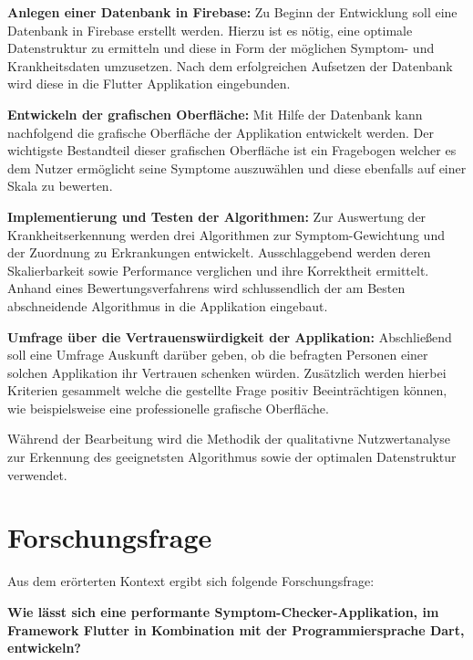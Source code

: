 \begin{description}
	\item \textbf{Anlegen einer Datenbank in Firebase:}
	Zu Beginn der Entwicklung soll eine Datenbank in Firebase erstellt werden. Hierzu ist es nötig, eine optimale Datenstruktur zu ermitteln und diese in Form der möglichen Symptom- und Krankheitsdaten umzusetzen. Nach dem erfolgreichen Aufsetzen der Datenbank wird diese in die Flutter Applikation eingebunden.
	
	\item \textbf{Entwickeln der grafischen Oberfläche:}
	Mit Hilfe der Datenbank kann nachfolgend die grafische Oberfläche der Applikation entwickelt werden. Der wichtigste Bestandteil dieser grafischen Oberfläche ist ein Fragebogen welcher es dem Nutzer ermöglicht seine Symptome auszuwählen und diese ebenfalls auf einer Skala zu bewerten.
	
	\item \textbf{Implementierung und Testen der Algorithmen:}
	 Zur Auswertung der Krankheitserkennung werden drei Algorithmen zur Symptom-Gewichtung und der Zuordnung zu Erkrankungen entwickelt. Ausschlaggebend werden deren Skalierbarkeit sowie Performance verglichen und ihre Korrektheit ermittelt. Anhand eines Bewertungsverfahrens wird schlussendlich der am Besten abschneidende Algorithmus in die Applikation eingebaut.
	 
	 \item \textbf{Umfrage über die Vertrauenswürdigkeit der Applikation:}
	 Abschließend soll eine Umfrage Auskunft darüber geben, ob die befragten Personen einer solchen Applikation ihr Vertrauen schenken würden. Zusätzlich werden hierbei Kriterien gesammelt welche die gestellte Frage positiv Beeinträchtigen können, wie beispielsweise eine professionelle grafische Oberfläche.
\end{description}
Während der Bearbeitung wird die Methodik der qualitativne Nutzwertanalyse zur Erkennung des geeignetsten Algorithmus sowie der optimalen Datenstruktur verwendet.
\section{Forschungsfrage}
Aus dem erörterten Kontext ergibt sich folgende Forschungsfrage:
	\begin{center}
	\textbf{Wie lässt sich eine performante Symptom-Checker-Applikation, im Framework Flutter in Kombination mit der Programmiersprache Dart, entwickeln?}
	\end{center}


